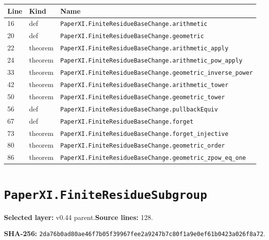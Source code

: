 \documentclass[10pt,oneside]{book}
\begin{document}
\begin{longtable}{@{}p{}p{}p{}@{}}\toprule Line&Kind&Name\\\midrule\endhead

16&def&\nolinkurl{PaperXI.FiniteResidueBaseChange.arithmetic}\\

20&def&\nolinkurl{PaperXI.FiniteResidueBaseChange.geometric}\\

22&theorem&\nolinkurl{PaperXI.FiniteResidueBaseChange.arithmetic_apply}\\

24&theorem&\nolinkurl{PaperXI.FiniteResidueBaseChange.arithmetic_pow_apply}\\

33&theorem&\nolinkurl{PaperXI.FiniteResidueBaseChange.geometric_inverse_power}\\

42&theorem&\nolinkurl{PaperXI.FiniteResidueBaseChange.arithmetic_tower}\\

50&theorem&\nolinkurl{PaperXI.FiniteResidueBaseChange.geometric_tower}\\

56&def&\nolinkurl{PaperXI.FiniteResidueBaseChange.pullbackEquiv}\\

67&def&\nolinkurl{PaperXI.FiniteResidueBaseChange.forget}\\

73&theorem&\nolinkurl{PaperXI.FiniteResidueBaseChange.forget_injective}\\

80&theorem&\nolinkurl{PaperXI.FiniteResidueBaseChange.geometric_order}\\

86&theorem&\nolinkurl{PaperXI.FiniteResidueBaseChange.geometric_zpow_eq_one}\\

\bottomrule\end{longtable}

\section{\texorpdfstring{\nolinkurl{PaperXI.FiniteResidueSubgroup}}{PaperXI.FiniteResidueSubgroup}}\label{module:PaperXI.FiniteResidueSubgroup}

\textbf{Selected layer:} v0.44 parent.\quad\textbf{Source lines:} 128.\par\textbf{SHA-256:} {\scriptsize\nolinkurl{2da76b0ad80ae46f7b05f39967fee2a9247b7c80f1a9e0ef61b0423a026f8a72}}.
\end{document}
